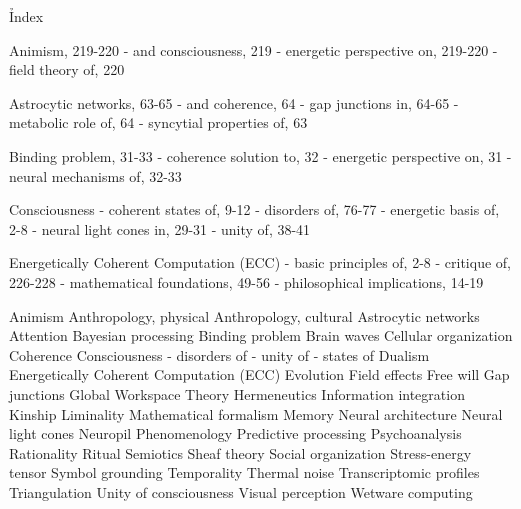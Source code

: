 \h{Index}

Animism, 219-220
- and consciousness, 219
- energetic perspective on, 219-220
- field theory of, 220

Astrocytic networks, 63-65
- and coherence, 64
- gap junctions in, 64-65
- metabolic role of, 64
- syncytial properties of, 63

Binding problem, 31-33
- coherence solution to, 32
- energetic perspective on, 31
- neural mechanisms of, 32-33

Consciousness
- coherent states of, 9-12
- disorders of, 76-77
- energetic basis of, 2-8
- neural light cones in, 29-31
- unity of, 38-41

Energetically Coherent Computation (ECC)
- basic principles of, 2-8
- critique of, 226-228
- mathematical foundations, 49-56
- philosophical implications, 14-19

Animism
Anthropology, physical
Anthropology, cultural
Astrocytic networks
Attention
Bayesian processing
Binding problem
Brain waves
Cellular organization
Coherence
Consciousness
- disorders of
- unity of
- states of
Dualism
Energetically Coherent Computation (ECC)
Evolution
Field effects
Free will
Gap junctions
Global Workspace Theory
Hermeneutics
Information integration
Kinship
Liminality
Mathematical formalism 
Memory
Neural architecture
Neural light cones
Neuropil
Phenomenology
Predictive processing
Psychoanalysis
Rationality
Ritual
Semiotics
Sheaf theory
Social organization
Stress-energy tensor
Symbol grounding
Temporality
Thermal noise
Transcriptomic profiles
Triangulation
Unity of consciousness
Visual perception
Wetware computing